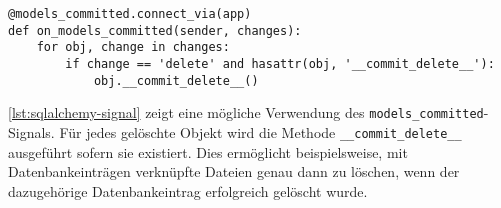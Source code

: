 \begin{lstlisting}[caption=Flask-SQLAlchemy-Signals,label=lst:sqlalchemy-signal]
@models_committed.connect_via(app)
def on_models_committed(sender, changes):
    for obj, change in changes:
        if change == 'delete' and hasattr(obj, '__commit_delete__'):
            obj.__commit_delete__()
\end{lstlisting}

\autoref{lst:sqlalchemy-signal} zeigt eine mögliche Verwendung des
\lstinline{models_committed}-Signals. Für jedes gelöschte Objekt wird die Methode
\lstinline{__commit_delete__} ausgeführt sofern sie existiert. Dies ermöglicht beispielsweise, mit
Datenbankeinträgen verknüpfte Dateien genau dann zu löschen, wenn der dazugehörige Datenbankeintrag
erfolgreich gelöscht wurde.
